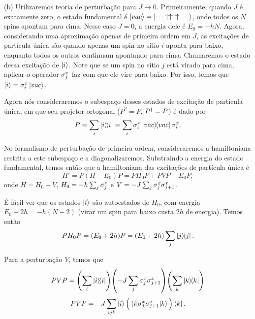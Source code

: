 \documentclass[a4paper,10pt]{article}
\newcommand{\vac}{\ket{vac}}
\begin{document}
\n\n

(b) Utilizaremos teoria de perturbação para $J \to 0$. Primeiramente, quando $J$ é exatamente zero, o estado fundamental é $\vac = \ket{\cdots\up\up\up\up\cdots}$, onde todos os $N$ spins apontam para cima. Nesse caso $J = 0$, a energia dele é $E_0 = -h N$. Agora, considerando uma aproximação apenas de primeira ordem em $J$, as excitações de partícula única são quando apenas um spin no sítio $i$ aponta para baixo, enquanto todos os outros continuam apontando para cima. Chamaremos o estado dessa excitação de $\ket{i}$. Note que se um spin no sítio $j$ está virado para cima, aplicar o operador $\sigma_j^x$ faz com que ele vire para baixo. Por isso, temos que $\ket{i} = \s_i^x \vac$.

\n

Agora nós consideraremos o subespaço desses estados de excitação de partícula única, em que seu projetor ortogonal ($P^2 = P$, $P^\dagger = P$) é dado por
$$
P = \sum_{i} \dyad{i} = \sum_{i} \s_i^x \dyad{vac} \s_i^x.
$$

\n

No formalismo de perturbação de primeira ordem, consideraremos a hamiltoniana restrita a este subespaço e a diagonalizaremos. Substraindo a energia do estado fundamental, temos então que a hamiltoniana das excitações de partícula única é
$$
H' = P(H - E_0) P = P H_0 P + P V P - E_0 P,
$$
onde $H = H_0 + V$, $H_0 = -h \sum_{j} \sigma_j^z$ e $V = -J \sum_{j} \sigma_j^x \sigma_{j+1}^x$.

\n\n

É fácil ver que os estados $\ket{i}$ são autoestados de $H_0$, com energia $E_0 + 2 h = -h (N-2)$ (virar um spin para baixo custa $2h$ de energia). Temos então
$$
P H_0 P = (E_0 + 2h) P = (E_0 + 2h) \sum_{j} \dyad{j}.
$$

\n

Para a perturbação $V$, temos que
$$
PVP =
\qty(
\sum_{i} \dyad{i}
)
\qty(
-J \sum_{j} \s_j^x \s_{j+1}^x
)
\qty(
\sum_{k} \dyad{k}
)
$$
$$
PVP =
-J \sum_{ijk} \ket{i}
\Big(
\mel{i}{\sigma_j^x \sigma_{j+1}^x}{k}
\Big)
\bra{k}.
$$

\n
\end{document}

